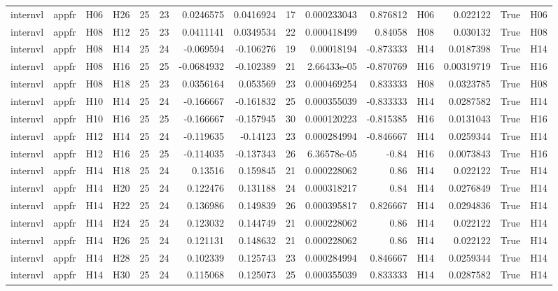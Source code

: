 \begin{longtable}{llllrrrrrrrlrrl}
internvl & appfr & H06 & H26 & 25 & 23 & 0.0246575 & 0.0416924 & 17 & 0.000233043 & 0.876812 & H06 & 0.022122 & True & H06 \\
internvl & appfr & H08 & H12 & 25 & 23 & 0.0411141 & 0.0349534 & 22 & 0.000418499 & 0.84058 & H08 & 0.030132 & True & H08 \\
internvl & appfr & H08 & H14 & 25 & 24 & -0.069594 & -0.106276 & 19 & 0.00018194 & -0.873333 & H14 & 0.0187398 & True & H14 \\
internvl & appfr & H08 & H16 & 25 & 25 & -0.0684932 & -0.102389 & 21 & 2.66433e-05 & -0.870769 & H16 & 0.00319719 & True & H16 \\
internvl & appfr & H08 & H18 & 25 & 23 & 0.0356164 & 0.053569 & 23 & 0.000469254 & 0.833333 & H08 & 0.0323785 & True & H08 \\
internvl & appfr & H10 & H14 & 25 & 24 & -0.166667 & -0.161832 & 25 & 0.000355039 & -0.833333 & H14 & 0.0287582 & True & H14 \\
internvl & appfr & H10 & H16 & 25 & 25 & -0.166667 & -0.157945 & 30 & 0.000120223 & -0.815385 & H16 & 0.0131043 & True & H16 \\
internvl & appfr & H12 & H14 & 25 & 24 & -0.119635 & -0.14123 & 23 & 0.000284994 & -0.846667 & H14 & 0.0259344 & True & H14 \\
internvl & appfr & H12 & H16 & 25 & 25 & -0.114035 & -0.137343 & 26 & 6.36578e-05 & -0.84 & H16 & 0.0073843 & True & H16 \\
internvl & appfr & H14 & H18 & 25 & 24 & 0.13516 & 0.159845 & 21 & 0.000228062 & 0.86 & H14 & 0.022122 & True & H14 \\
internvl & appfr & H14 & H20 & 25 & 24 & 0.122476 & 0.131188 & 24 & 0.000318217 & 0.84 & H14 & 0.0276849 & True & H14 \\
internvl & appfr & H14 & H22 & 25 & 24 & 0.136986 & 0.149839 & 26 & 0.000395817 & 0.826667 & H14 & 0.0294836 & True & H14 \\
internvl & appfr & H14 & H24 & 25 & 24 & 0.123032 & 0.144749 & 21 & 0.000228062 & 0.86 & H14 & 0.022122 & True & H14 \\
internvl & appfr & H14 & H26 & 25 & 24 & 0.121131 & 0.148632 & 21 & 0.000228062 & 0.86 & H14 & 0.022122 & True & H14 \\
internvl & appfr & H14 & H28 & 25 & 24 & 0.102339 & 0.125743 & 23 & 0.000284994 & 0.846667 & H14 & 0.0259344 & True & H14 \\
internvl & appfr & H14 & H30 & 25 & 24 & 0.115068 & 0.125073 & 25 & 0.000355039 & 0.833333 & H14 & 0.0287582 & True & H14 \\

\end{longtable}
